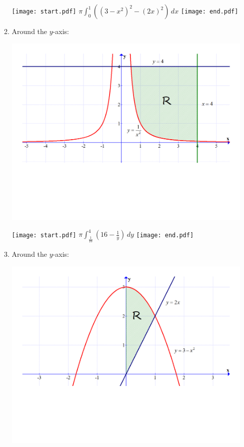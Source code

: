 \documentclass[12pt]{article}
\begin{document}
\begin{enumerate}
\begin{enumerate}
\begin{center}
\end{center}

\texttt{[image: start.pdf]}
{{$\pi\int_0^1 \left((3-x^2)^2-(2x)^2\right)\,dx$}}
\texttt{[image: end.pdf]}


\item Around the $y$-axis:

\begin{center}

\includegraphics[scale=0.3]{graph3.pdf}

\end{center}

\texttt{[image: start.pdf]}
{{$\pi\int_{\frac{1}{16}}^4 \left(16-\frac{1}{y}\right) \,dy$}}
\texttt{[image: end.pdf]}


\item Around the $y$-axis:

\begin{center}

\includegraphics[scale=0.3]{graph2.pdf}


\end{center}
\end{enumerate}
\end{enumerate}
\end{document}
